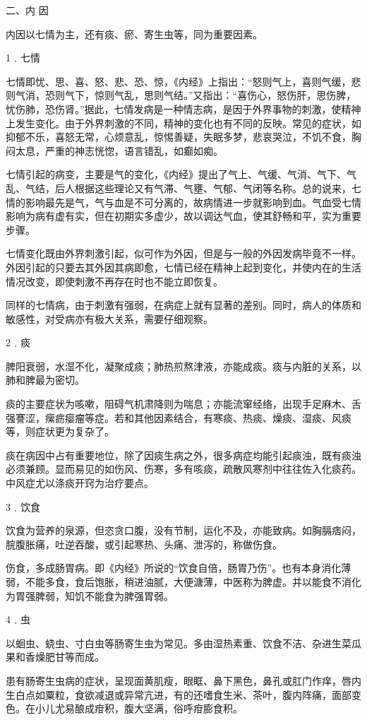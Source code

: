 \documentclass[12pt,UTF8]{ctexbook}
\begin{document}
二、内 因

内因以七情为主，还有痰、瘀、寄生虫等，同为重要因素。

1﹒七情

七情即忧、思、喜、怒、悲、恐、惊，《内经》上指出：“怒则气上，喜则气缓，悲则气消，恐则气下，惊则气乱，思则气结。”又指出：“喜伤心，怒伤肝，思伤脾，忧伤肺，恐伤肾。”据此，七情发病是一种情志病，是因于外界事物的刺激，使精神上发生变化。由于外界刺激的不同，精神的变化也有不同的反映。常见的症状，如抑郁不乐，喜怒无常，心烦意乱，惊惕善疑，失眠多梦，悲哀哭泣，不饥不食，胸闷太息，严重的神志恍惚，语言错乱，如癫如痴。

七情引起的病变，主要是气的变化，《内经》提出了气上、气缓、气消、气下、气乱、气结，后人根据这些理论又有气滞、气壅、气郁、气闭等名称。总的说来，七情的影响最先是气，气与血是不可分离的，故病情进一步就影响到血。气血受七情影响为病有虚有实，但在初期实多虚少，故以调达气血，使其舒畅和平，实为重要步骤。

七情变化既由外界刺激引起，似可作为外因，但是与一般的外因发病毕竟不一样。外因引起的只要去其外因其病即愈，七情已经在精神上起到变化，并使内在的生活情况改变，即使刺激不再存在时也不能立即恢复。

同样的七情病，由于刺激有强弱，在病症上就有显著的差别。同时，病人的体质和敏感性，对受病亦有极大关系，需要仔细观察。

2﹒痰

脾阳衰弱，水湿不化，凝聚成痰；肺热煎熬津液，亦能成痰。痰与内脏的关系，以肺和脾最为密切。

痰的主要症状为咳嗽，阻碍气机肃降则为喘息；亦能流窜经络，出现手足麻木、舌强謇涩，瘰疬瘿瘤等症。若和其他因素结合，有寒痰、热痰、燥痰、湿痰、风痰等，则症状更为复杂了。

痰在病因中占有重要地位，除了因痰生病之外，很多病症均能引起痰浊，既有痰浊必须兼顾。显而易见的如伤风、伤寒，多有咳痰，疏散风寒剂中往往佐入化痰药。中风症尤以涤痰开窍为治疗要点。

3﹒饮食

饮食为营养的泉源，但恣贪口腹，没有节制，运化不及，亦能致病。如胸膈痞闷，脘腹胀痛，吐逆吞酸，或引起寒热、头痛、泄泻的，称做伤食。

伤食，多成肠胃病。即《内经》所说的“饮食自倍，肠胃乃伤”。也有本身消化薄弱，不能多食，食后饱胀，稍进油腻，大便溏薄，中医称为脾虚。并以能食不消化为胃强脾弱，知饥不能食为脾强胃弱。

4﹒虫

以蛔虫、蛲虫、寸白虫等肠寄生虫为常见。多由湿热素重、饮食不洁、杂进生菜瓜果和香燥肥甘等而成。

患有肠寄生虫病的症状，呈现面黄肌瘦，眼眶、鼻下黑色，鼻孔或肛门作痒，唇内生白点如粟粒，食欲减退或异常亢进，有的还嗜食生米、茶叶，腹内阵痛，面部变色。在小儿尤易酿成疳积，腹大坚满，俗呼疳膨食积。
\end{document}
